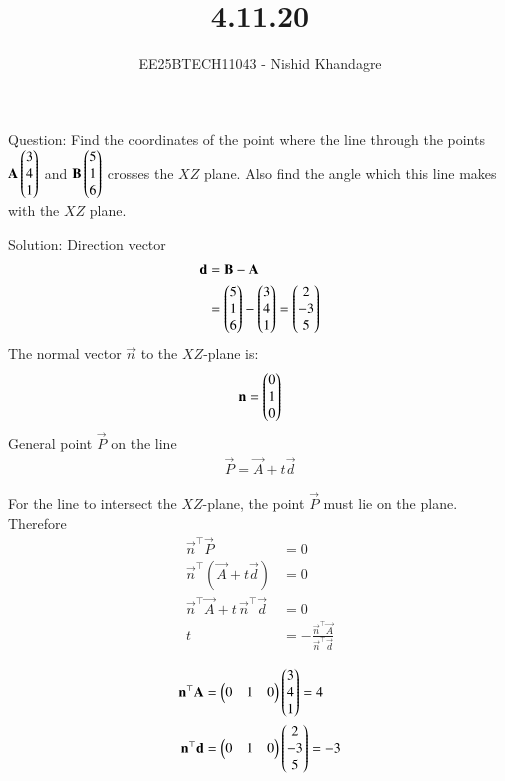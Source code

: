 \documentclass[journal]{IEEEtran}
\title{4.11.20}
\author{EE25BTECH11043 - Nishid Khandagre}
\begin{document}
\maketitle

\renewcommand{\thefigure}{\theenumi}
\renewcommand{\thetable}{\theenumi}


Question:
Find the coordinates of the point where the line through the points $\mathbf{A} \begin{pmatrix}3\\4\\1\end{pmatrix}$ and $\mathbf{B}\begin{pmatrix}5\\1\\6\end{pmatrix}$ crosses the $XZ$ plane. Also find the angle which this line makes with the $XZ$ plane.

Solution: 
Direction vector
\begin{align}
    \mathbf{d} &= \mathbf{B} - \mathbf{A}\\
    &=\begin{pmatrix}5 \\ 1 \\ 6\end{pmatrix} - \begin{pmatrix}3 \\ 4 \\ 1\end{pmatrix} = \begin{pmatrix}2 \\ -3 \\ 5\end{pmatrix}
\end{align}
The normal vector $\vec{n}$ to the $XZ$-plane is:
\begin{align}
    \mathbf{n} = \begin{pmatrix}0 \\ 1 \\ 0\end{pmatrix}
\end{align}
General point $\vec{P}$ on the line
\begin{align}
    \vec{P} = \vec{A} + t\vec{d}
\end{align}

For the line to intersect the $XZ$-plane, the point $\vec{P}$ must lie on the plane.
Therefore
\begin{align}
    \vec{n}^\top\vec{P}&=0\\
    \vec{n}^\top (\vec{A} + t\vec{d}) &= 0 \\
    \vec{n}^\top \vec{A} + t \, \vec{n}^\top \vec{d} &= 0 \\
    t &= -\frac{\vec{n}^\top \vec{A}}{\vec{n}^\top \vec{d}}
\end{align}

\begin{align}
    \mathbf{n}^\top \mathbf{A} &= \begin{pmatrix}0 & 1 & 0\end{pmatrix} \begin{pmatrix}3 \\ 4 \\ 1\end{pmatrix} = 4 \\
    \mathbf{n}^\top \mathbf{d} &= \begin{pmatrix}0 & 1 & 0\end{pmatrix} \begin{pmatrix}2 \\ -3 \\ 5\end{pmatrix} = -3
\end{align}
\end{document}
